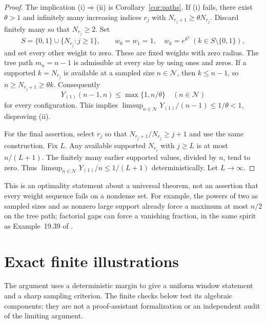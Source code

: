 \documentclass[11pt]{amsart}
\theoremstyle{remark}\newtheorem{remark}[theorem]{Remark}
\begin{document}
\begin{proof}
The implication (i)$\Rightarrow$(ii) is Corollary~\ref{cor:paths}.
If (i) fails, there exist $\theta>1$ and infinitely many increasing indices
$r_j$ with $N_{r_j+1}\ge\theta N_{r_j}$. Discard finitely many so that
$N_{r_j}\ge2$. Set
\[
 S=\{0,1\}\cup\{N_{r_j}:j\ge1\},\qquad
 w_0=w_1=1,\quad w_k=e^{k^2}\ (k\in S\setminus\{0,1\}),
\]
and set every other weight to zero. These are fixed weights with zero
radius. The tree path $m_n=n-1$ is admissible at every size by using ones
and zeros. If a supported $k=N_{r_j}$ is available at a sampled size
$n\in\mathcal N$, then $k\le n-1$, so
$n\ge N_{r_j+1}\ge\theta k$. Consequently
\[
 Y_{(1)}(n-1,n)\le\max\{1,n/\theta\}
 \quad(n\in\mathcal N)
\]
for every configuration. This implies
$\limsup_{n\in\mathcal N}Y_{(1)}/(n-1)\le1/\theta<1$, disproving (ii).

For the final assertion, select $r_j$ so that
$N_{r_j+1}/N_{r_j}\ge j+1$ and use the same construction. Fix $L$.
Any available supported $N_{r_j}$ with $j\ge L$ is at most $n/(L+1)$.
The finitely many earlier supported values, divided by $n$, tend to zero.
Thus $\limsup_{n\in\mathcal N}Y_{(1)}/n\le1/(L+1)$ deterministically.
Let $L\to\infty$.
\end{proof}

This is an optimality statement about a universal theorem, not an assertion
that every weight sequence fails on a nondense set. For example, the powers
of two as sampled sizes and as nonzero large support already force a
maximum at most $n/2$ on the tree path; factorial gaps can force a vanishing
fraction, in the same spirit as Example~19.39 of \cite{Janson}.

\section{Exact finite illustrations}\label{sec:finite}
The argument uses a deterministic margin to give a uniform window statement
and a sharp sampling criterion. The finite checks below test its algebraic
components; they are not a proof-assistant formalization or an independent
audit of the limiting argument.
\end{document}

